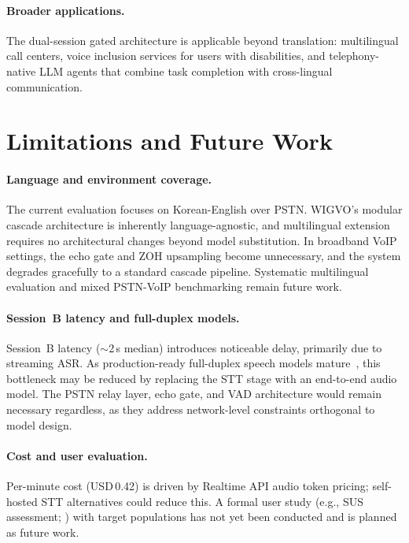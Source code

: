 \documentclass[11pt]{article}
\begin{document}
\paragraph{Broader applications.}
The dual-session gated architecture is applicable beyond translation: multilingual call centers, voice inclusion services for users with disabilities, and telephony-native LLM agents that combine task completion with cross-lingual communication.

\section{Limitations and Future Work}

\paragraph{Language and environment coverage.}
The current evaluation focuses on Korean-English over PSTN. WIGVO's modular cascade architecture is inherently language-agnostic, and multilingual extension requires no architectural changes beyond model substitution. In broadband VoIP settings, the echo gate and ZOH upsampling become unnecessary, and the system degrades gracefully to a standard cascade pipeline. Systematic multilingual evaluation and mixed PSTN-VoIP benchmarking remain future work.

\paragraph{Session~B latency and full-duplex models.}
Session~B latency (${\sim}$2\,s median) introduces noticeable delay, primarily due to streaming ASR. As production-ready full-duplex speech models mature~\citep{defossez2024moshi, labiausse2025hibiki}, this bottleneck may be reduced by replacing the STT stage with an end-to-end audio model. The PSTN relay layer, echo gate, and VAD architecture would remain necessary regardless, as they address network-level constraints orthogonal to model design.

\paragraph{Cost and user evaluation.}
Per-minute cost (USD\,0.42) is driven by Realtime API audio token pricing; self-hosted STT alternatives could reduce this. A formal user study (e.g., SUS assessment; \citealt{brooke_sus_1996}) with target populations has not yet been conducted and is planned as future work.
\end{document}

